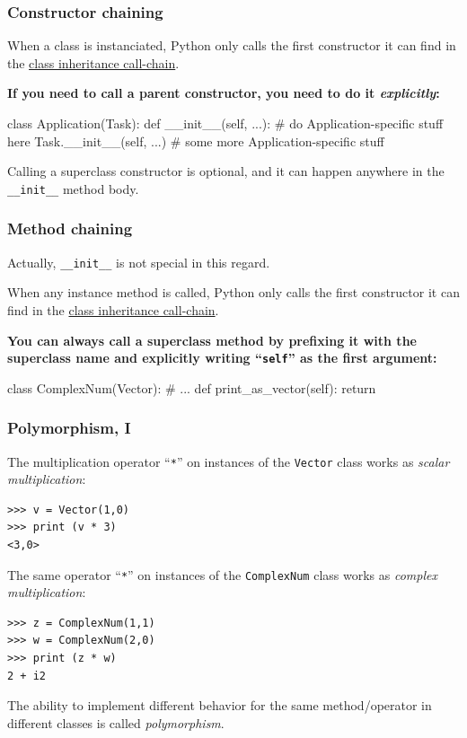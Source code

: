 \documentclass[english,serif,mathserif,xcolor=pdftex,dvipsnames,table]{beamer}
\begin{document}
\begin{frame}[fragile]
  \frametitle{Constructor chaining}

    When a class is instanciated, Python only calls the first
    constructor it can find in the
    \href{http://www.python.org/download/releases/2.3/mro/}{class inheritance call-chain}.

    \+ \textbf{If you need to call a parent constructor, you need
      to do it \emph{explicitly}:}
    \begin{python}
class Application(Task):
  def __init__(self, ...):
    # do Application-specific stuff here
    Task.__init__(self, ...)
    # some more Application-specific stuff
    \end{python}

    \+
    Calling a superclass constructor is optional, and
    it can happen anywhere in the \lstinline|__init__| method body.
\end{frame}


\begin{frame}[fragile]
  \frametitle{Method chaining}

  Actually, \lstinline|__init__| is not special in this regard.

  \+ When any instance method is called, Python only calls the first
  constructor it can find in the
  \href{http://www.python.org/download/releases/2.3/mro/}{class
    inheritance call-chain}.

  \+ \textbf{You can always call a superclass method by prefixing it
    with the superclass name and explicitly writing ``\texttt{self}''
    as the first argument:}
    \begin{python}
class ComplexNum(Vector):
  # ...
  def print_as_vector(self):
    return ~~
    \end{python}
\end{frame}


\begin{frame}[fragile]
  \frametitle{Polymorphism, I}

  The multiplication operator ``\texttt{*}'' on instances of the
  \lstinline|Vector| class works as \emph{scalar multiplication}:
\begin{lstlisting}
>>> v = Vector(1,0)
>>> print (v * 3)
<3,0>
\end{lstlisting}

  \+
  The same operator ``\texttt{*}'' on instances of the
  \lstinline|ComplexNum| class works as \emph{complex multiplication}:
\begin{lstlisting}
>>> z = ComplexNum(1,1)
>>> w = ComplexNum(2,0)
>>> print (z * w)
2 + i2
\end{lstlisting}

  \+\small
  The ability to implement different behavior for the same
  method/operator in different classes is called \emph{polymorphism}.

\end{frame}
\end{document}
